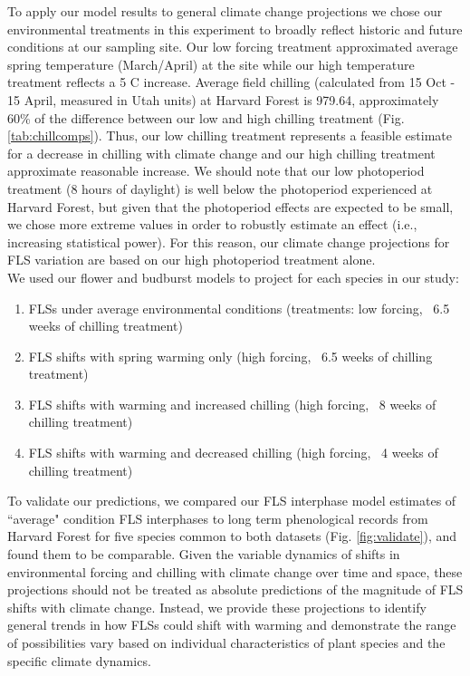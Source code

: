 \documentclass[11pt]{article}\usepackage[]{graphicx}\usepackage[]{color}
\begin{document}
\noindent To apply our model results to general climate change projections we chose our environmental treatments in this experiment to broadly reflect historic and future conditions at our sampling site. Our low forcing treatment approximated average spring temperature (March/April) at the site while our high temperature treatment reflects a 5 \degree C increase. Average field chilling (calculated from 15 Oct - 15 April, measured in Utah units) at Harvard Forest is 979.64, approximately 60\% of the difference between our low and high chilling treatment (Fig. \ref{tab:chillcomps}). Thus, our low chilling treatment represents a feasible estimate for a decrease in chilling with climate change and our high chilling treatment approximate reasonable increase. We should note that our low photoperiod treatment (8 hours of daylight) is well below the photoperiod experienced at Harvard Forest, but given that the photoperiod effects are expected to be small, we chose more extreme values in order to robustly estimate an effect (i.e., increasing statistical power). For this reason, our climate change projections for FLS variation are based on our high photoperiod treatment alone.\\

\noindent We used our flower and budburst models to project for each species in our study:\\
\begin{enumerate}
\item FLSs under average environmental conditions  (treatments: low forcing, ~6.5 weeks of chilling treatment)
\item FLS shifts with spring warming only (high forcing, ~6.5 weeks of chilling treatment)
\item FLS shifts with warming and increased chilling (high forcing, ~8 weeks of chilling treatment)
\item FLS shifts with warming and decreased chilling (high forcing, ~4 weeks of chilling treatment)
\end{enumerate}

\noindent To validate our predictions, we compared our FLS interphase model estimates of ``average" condition FLS interphases to long term phenological records from Harvard Forest \citep{OKeefe2015} for five species common to both datasets (Fig. \ref{fig:validate}), and found them to be comparable. Given the variable dynamics of shifts in environmental forcing and chilling with climate change over time and space, these projections should not be treated as absolute predictions of the magnitude of FLS shifts with climate change. Instead, we provide these projections to identify general trends in how FLSs could shift with warming and demonstrate the range of possibilities vary based on individual characteristics of plant species and the specific climate dynamics.\\
\end{document}
